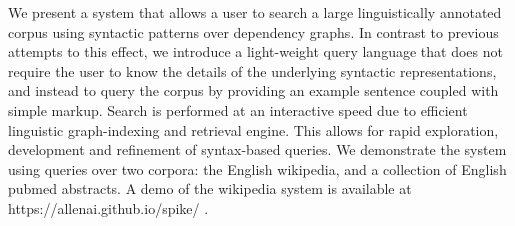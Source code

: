 We present a system that allows a user to search a large linguistically annotated corpus using syntactic patterns over dependency graphs. In contrast to previous attempts to this effect, we introduce a light-weight query language that does not require the user to know the details of the underlying syntactic representations, and instead to query the corpus by providing an example sentence coupled with simple markup. Search is performed at an interactive speed due to efficient linguistic graph-indexing and retrieval engine. This allows for rapid exploration, development and refinement of syntax-based queries. We demonstrate the system using queries over two corpora: the English wikipedia, and a collection of English pubmed abstracts. A demo of the wikipedia system is available at https://allenai.github.io/spike/ .
